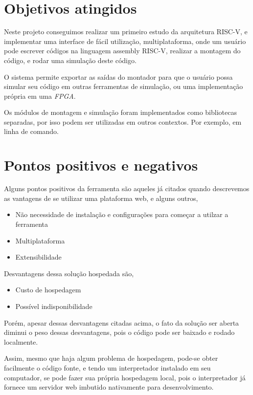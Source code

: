 \section{Objetivos atingidos}

	Neste projeto conseguimos realizar um primeiro estudo da arquitetura RISC-V, e implementar uma interface de fácil utilização, multiplataforma, onde um usuário pode escrever códigos na linguagem assembly RISC-V, realizar a montagem do código, e rodar uma simulação deste código.

	O sistema permite exportar as saídas do montador para que o usuário possa simular seu código em outras ferramentas de simulação, ou uma implementação própria em uma \textit{FPGA}.

	Os módulos de montagem e simulação foram implementados como bibliotecas separadas, por isso podem ser utilizadas em outros contextos. Por exemplo, em linha de comando.

\section{Pontos positivos e negativos}

	Alguns pontos positivos da ferramenta são aqueles já citados quando descrevemos as vantagens de se utilizar uma plataforma web, e alguns outros,
	\begin{itemize}
		\item Não necessidade de instalação e configurações para começar a utilzar a ferramenta
		\item Multiplataforma
		\item Extensibilidade
	\end{itemize}

	Desvantagens dessa solução hospedada são,

	\begin{itemize}
		\item Custo de hospedagem
		\item Possível indisponibilidade	
	\end{itemize}

	Porém, apesar dessas desvantagens citadas acima, o fato da solução ser aberta diminui o peso dessas desvantagens, pois o código pode ser baixado e rodado localmente. 

	Assim, mesmo que haja algum problema de hospedagem, pode-se obter facilmente o código fonte, e tendo um interpretador instalado em seu computador, se pode fazer sua própria hospedagem local, pois o interpretador já fornece um servidor web imbutido nativamente para desenvolvimento.


